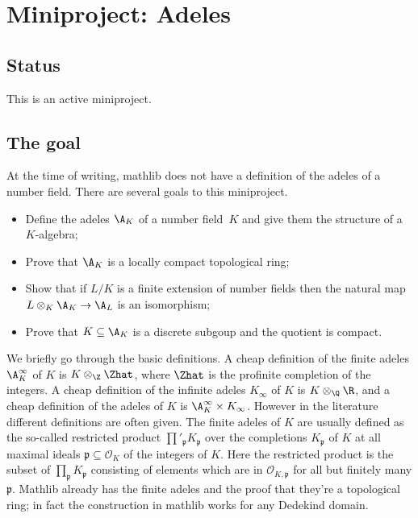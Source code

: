 \chapter{Miniproject: Adeles}\label{Adele_miniproject}

\section{Status}

This is an active miniproject.

\section{The goal}

At the time of writing, mathlib does not have a definition of the adeles of
a number field. There are several goals to this miniproject.

\begin{itemize}
  \item Define the adeles $\A_K$ of a number field~$K$ and
  give them the structure of a $K$-algebra;
  \item Prove that $\A_K$ is a locally compact topological ring;
  \item Show that if $L/K$ is a finite extension of number fields then the
    natural map $L\otimes_K\A_K\to\A_L$ is an isomorphism;
  \item Prove that $K \subseteq \A_K$ is a discrete subgoup and the quotient is compact.
\end{itemize}

We briefly go through the basic definitions. A cheap definition of the finite
adeles $\A_K^\infty$ of $K$ is $K\otimes_{\Z}\Zhat$, where $\Zhat$ is
the profinite completion of the integers. A cheap definition of the infinite adeles
$K_\infty$ of $K$ is $K\otimes_{\Q}\R$, and a cheap definition of the adeles
of $K$ is $\A_K^\infty\times K_\infty$. However in the literature different definitions
are often given. The finite adeles of $K$ are usually defined
as the so-called restricted product $\prod'_{\mathfrak{p}}K_{\mathfrak{p}}$ over the completions
$K_{\mathfrak{p}}$ of $K$ at all maximal ideals $\mathfrak{p}\subseteq\mathcal{O}_K$ of the
integers of $K$. Here the restricted product is the subset of $\prod_{\mathfrak{p}}K_{\mathfrak{p}}$
consisting of elements which are in $\mathcal{O}_{K,\mathfrak{p}}$ for all but finitely many
$\mathfrak{p}$.
Mathlib already has the finite adeles and the proof that they're a topological ring;
in fact the construction in mathlib works for any Dedekind domain.

